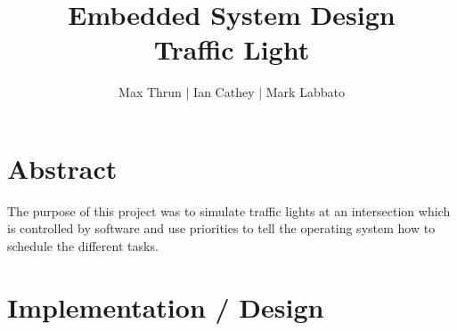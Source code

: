 \documentclass[10pt]{article}
\title{Embedded System Design \\ Traffic Light}
\author{ Max Thrun | Ian Cathey | Mark Labbato }
\begin{document}
\maketitle

\section*{Abstract}

The purpose of this project was to simulate traffic lights at an intersection
which is controlled by software and use priorities to tell the operating
system how to schedule the different tasks.

\section*{Implementation / Design}
\end{document}
